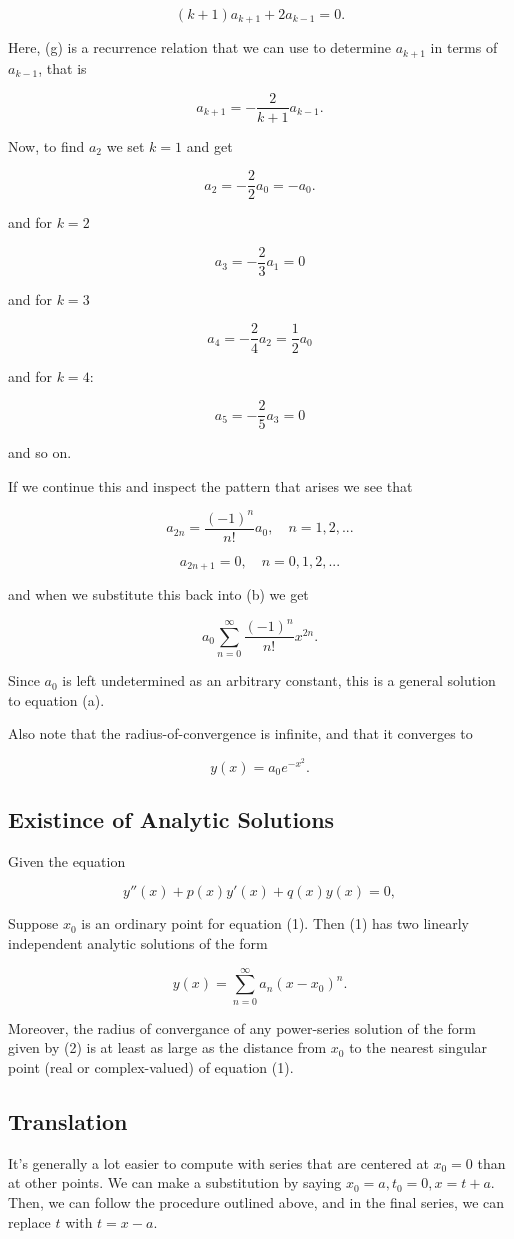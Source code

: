 \documentclass{article}
\begin{document}
\[ (k+1)a_{k+1} + 2a_{k-1} = 0. \tag{g} \]

Here, (g) is a recurrence relation that we can use to determine $a_{k+1}$ in terms of $a_{k-1}$, that is

\[ a_{k+1} = - \frac{2}{k+1}a_{k-1}. \]

Now, to find $a_2$ we set $k=1$ and get

\[ a_2 = - \frac{2}{2}a_0 = -a_0. \]

and for $k=2$

\[ a_3 = - \frac{2}{3}a_1 = 0 \]

and for $k=3$

\[ a_4 = -\frac{2}{4}a_2 = \frac{1}{2}a_0 \]

and for $k=4$:

\[ a_5 = -\frac{2}{5}a_3 = 0 \]

and so on.

If we continue this and inspect the pattern that arises we see that

\[ a_{2n} = \frac{(-1)^n}{n!} a_0, \quad n = 1,2,... \]

\[ a_{2n+1} = 0 , \quad n = 0,1,2,... \]

and when we substitute this back into (b) we get

\[ a_0 \sum_{n=0}^{\infty} \frac{(-1)^n}{n!}x^{2n}. \]

Since $a_0$ is left undetermined as an arbitrary constant, this is a general solution to equation (a).

Also note that the \@{radius-of-convergence} is infinite, and that it converges to

\[ y(x) = a_0 e^{-x^2}. \]

\subsection{Existince of Analytic Solutions}

Given the equation

\[ y''(x) + p(x)y'(x) +q(x)y(x) = 0, \tag{1} \]

Suppose $x_0$ is an ordinary point for equation (1). Then (1) has two linearly independent \@{analytic} solutions of the form

\[ y(x) = \sum_{n=0}^{\infty} a_n (x-x_0)^n. \tag{2} \]

Moreover, the radius of convergance of any \@{power-series} solution of the form given by (2) is at least as large as the distance from $x_0$ to the nearest singular point (real or complex-valued) of equation (1).

\subsection{Translation}

It's generally a lot easier to compute with series that are centered at $x_0=0$ than at other points. We can make a substitution by saying $x_0 = a, t_0 = 0, x = t + a$. Then, we can follow the procedure outlined above, and in the final series, we can replace $t$ with $t = x - a$.
\end{document}
